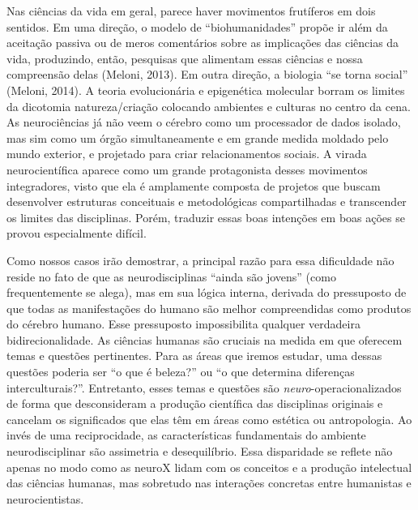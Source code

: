 Nas ciências da vida em geral, parece haver movimentos frutíferos em
dois sentidos. Em uma direção, o modelo de ``biohumanidades'' propõe ir
além da aceitação passiva ou de meros comentários sobre as implicações
das ciências da vida, produzindo, então, pesquisas que alimentam essas
ciências e nossa compreensão delas (Meloni, 2013). Em outra direção, a
biologia ``se torna social'' (Meloni, 2014). A teoria evolucionária e
epigenética molecular borram os limites da dicotomia natureza/criação
colocando ambientes e culturas no centro da cena. As neurociências já
não veem o cérebro como um processador de dados isolado, mas sim como um
órgão simultaneamente e em grande medida moldado pelo mundo exterior, e
projetado para criar relacionamentos sociais. A virada neurocientífica
aparece como um grande protagonista desses movimentos integradores,
visto que ela é amplamente composta de projetos que buscam desenvolver
estruturas conceituais e metodológicas compartilhadas e transcender os
limites das disciplinas. Porém, traduzir essas boas intenções em boas
ações se provou especialmente difícil.

Como nossos casos irão demostrar, a principal razão para essa
dificuldade não reside no fato de que as neurodisciplinas ``ainda são
jovens'' (como frequentemente se alega), mas em sua lógica interna,
derivada do pressuposto de que todas as manifestações do humano são
melhor compreendidas como produtos do cérebro humano. Esse pressuposto
impossibilita qualquer verdadeira bidirecionalidade. As ciências humanas
são cruciais na medida em que oferecem temas e questões pertinentes.
Para as áreas que iremos estudar, uma dessas questões poderia ser ``o
que é beleza?'' ou ``o que determina diferenças interculturais?''.
Entretanto, esses temas e questões são \emph{neuro}-operacionalizados de
forma que desconsideram a produção científica das disciplinas originais
e cancelam os significados que elas têm em áreas como estética ou
antropologia. Ao invés de uma reciprocidade, as características
fundamentais do ambiente neurodisciplinar são assimetria e
desequilíbrio. Essa disparidade se reflete não apenas no modo como as
neuroX lidam com os conceitos e a produção intelectual das ciências
humanas, mas sobretudo nas interações concretas entre humanistas e
neurocientistas.

